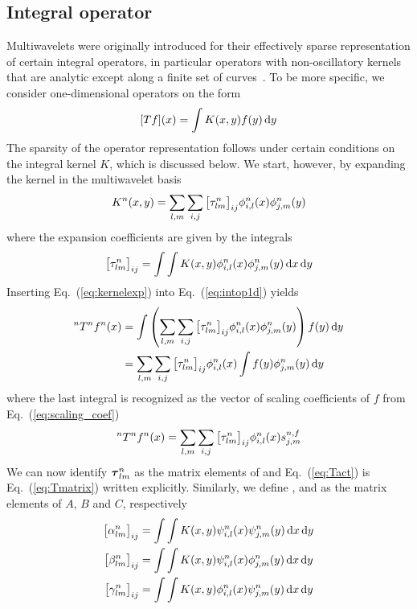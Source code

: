 \subsection{Integral operator}
Multiwavelets were originally introduced for their effectively sparse 
representation of certain integral operators, in particular operators with 
non-oscillatory kernels that are analytic except along a finite set of 
curves~\cite{Alpert:1993p5460}. To be more specific, we consider one-dimensional 
operators on the form
\begin{equation}
    \label{eq:intop1d}
    [Tf](x) = \int K(x,y) f(y) \,\mathrm{d} y
\end{equation}
The sparsity of the operator representation follows under certain conditions 
on the integral kernel $K$, which is discussed below. We start, however, by 
expanding the kernel in the multiwavelet basis
\begin{equation}
    \label{eq:kernelexp}
    K^n(x,y) = \sum_{l,m} \sum_{i,j}
	\big[\tau^n_{lm}\big]_{ij} 
	\phi_{i,l}^n(x)
	\phi_{j,m}^n(y)
\end{equation}
where the expansion coefficients are given by the integrals
\begin{equation}
    \label{eq:taudef}
    \big[\tau^n_{lm}\big]_{ij} = \int\int
	K(x,y)\phi^n_{i,l}(x)\phi^n_{j,m}(y)\,\mathrm{d} x \,\mathrm{d} y
\end{equation}
Inserting Eq.~(\ref{eq:kernelexp}) into Eq.~(\ref{eq:intop1d}) yields
\begin{align}
    ^{n}T^{n}{f}^{n}(x) &= \int\left(\sum_{l,m} \sum_{i,j}
	\big[\tau^n_{lm}\big]_{ij}
	\phi^n_{i,l}(x)
	\phi^n_{j,m}(y)
	\right)f(y)\,\mathrm{d} y\\
	&= \sum_{l,m} \sum_{i,j}
	\big[\tau^n_{lm}\big]_{ij}
	\phi^n_{i,l}(x)
	\int f(y)\phi^n_{j,m}(y)\,\mathrm{d} y
\end{align}
where the last integral is recognized as the vector of scaling coefficients of $f$ 
from Eq.~(\ref{eq:scaling_coef})
\begin{equation}
    \label{eq:Tact}
    ^{n}T^{n}{f}^{n}(x) = \sum_{l,m} \sum_{i,j} 
	\big[\tau^n_{lm}\big]_{ij}
	\phi^n_{i,l}(x)
	s^{n,f}_{j,m}
\end{equation}
We can now identify $\boldsymbol{\tau}^n_{lm}$ as the matrix elements of  
and Eq.~(\ref{eq:Tact}) is Eq.~(\ref{eq:Tmatrix}) written explicitly. 
Similarly, we define \alphamat, \betamat and \gammamat as the matrix 
elements of $A$, $B$ and $C$, respectively
\begin{align}
    \label{eq:tcbadef}
    \big[\alpha^n_{lm}\big]_{ij} &= \int\int
	K(x,y)\psi^n_{i,l}(x)\psi^n_{j,m}(y)\,\mathrm{d} x \,\mathrm{d} y\\
    \big[\beta^n_{lm}\big]_{ij} &= \int\int
	K(x,y)\psi^n_{i,l}(x)\phi^n_{j,m}(y)\,\mathrm{d} x \,\mathrm{d} y\\
    \big[\gamma^n_{lm}\big]_{ij} &= \int\int
	K(x,y)\phi^n_{i,l}(x)\psi^n_{j,m}(y)\,\mathrm{d} x \,\mathrm{d} y
\end{align}
